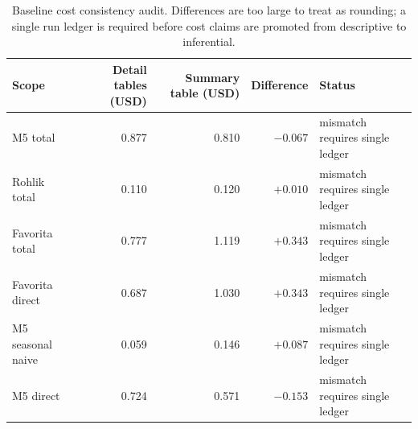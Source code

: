 \begin{table}[htbp]
\centering
\caption{Baseline cost consistency audit.  Differences are too large to
treat as rounding; a single run ledger is required before cost claims are
promoted from descriptive to inferential.}
\label{tab:t56}
\small
\begin{tabularx}{\textwidth}{lrrrX}
\toprule
Scope & Detail tables (USD) & Summary table (USD) & Difference & Status \\
\midrule
M5 total & 0.877 & 0.810 & $-0.067$ & mismatch requires single ledger \\
Rohlik total & 0.110 & 0.120 & $+0.010$ & mismatch requires single ledger \\
Favorita total & 0.777 & 1.119 & $+0.343$ & mismatch requires single ledger \\
Favorita direct & 0.687 & 1.030 & $+0.343$ & mismatch requires single ledger \\
M5 seasonal naive & 0.059 & 0.146 & $+0.087$ & mismatch requires single ledger \\
M5 direct & 0.724 & 0.571 & $-0.153$ & mismatch requires single ledger \\
\bottomrule
\end{tabularx}
\end{table}
